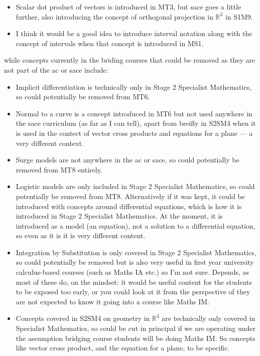 \documentclass[twoside,12pt,a4paper]{report}
\begin{document}
\begin{itemize}
	\item Scalar dot product of vectors is introduced in MT3, but \gls{sace} goes a little further, also introducing the concept of orthogonal projection in $\mathbb{R}^2$ in S1M9.
	\item I think it would be a good idea to introduce interval notation along with the concept of intervals when that concept is introduced in MS1.
\end{itemize}


while concepts currently in the briding courses that could be removed as they are not part of the \gls{ac} or \gls{sace} include:
\begin{itemize}
	\item Implicit differentiation is technically only in Stage 2 Specialist Mathematics, so could potentially be removed from MT6.
	\item Normal to a curve is a concept introduced in MT6 but not used anywhere in the \gls{sace} curriculum (as far as I can tell), apart from breifly in S2SM4 when it is used in the contect of vector cross products and equations for a plane --- a very different context.
	\item Surge models are not anywhere in the \gls{ac} or \gls{sace}, so could potentially be removed from MT8 entirely.	
	\item Logistic models are only included in Stage 2 Specialist Mathematics, so could potentially be removed from MT8. Alternatively if it was kept, it could be introduced with concepts around differential equations, which is how it is introduced in Stage 2 Specialist Mathematics. At the moment, it is introduced as a model (an equation), not a solution to a differential equation, so even as it is it is very different content.
	\item Integration by Substitution is only covered in Stage 2 Specialist Mathematics, so could potentially be removed but is also very useful in first year university calculus-based courses (such as Maths IA etc.) so I'm not sure. Depends, as most of these do, on the mindset: it would be useful content for the students to be exposed too early, or you could look at it from the perspective of they are not expected to know it going into a course like Maths IM. 
	\item Concepts covered in S2SM4 on geometry in $\mathbb{R}^3$ are technically only covered in Specialist Mathematics, so could be cut in principal if we are operating under the assumption bridging course students will be doing Maths IM. So concepts like vector cross product, and the equation for a plane, to be specific.

\end{itemize}
\end{document}
